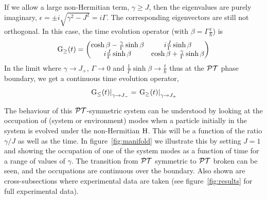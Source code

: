 If we allow a large non-Hermitian term, \( \gamma \geq J \), then the
eigenvalues are purely imaginary, \( \epsilon = \pm i \sqrt{ \gamma^{2} - J^{2}
} = i \Gamma \). The corresponding eigenvectors are still not orthogonal. In
this case, the time evolution operator (with \( \beta = \Gamma \frac{t}{\hbar}
\)) is
\begin{equation}
  \mathrm{G}_{\geq} \!\left(t\right) = \begin{pmatrix}
    \cosh \beta - \frac{\gamma}{\Gamma} \sinh \beta &
    i \frac{J}{\Gamma} \sinh \beta \\
    i \frac{J}{\Gamma} \sinh \beta &
    \cosh \beta + \frac{\gamma}{\Gamma} \sinh \beta
  \end{pmatrix}
\end{equation}
In the limit where \( \gamma \rightarrow J_{+} \), \( \Gamma \rightarrow 0 \)
and \( \frac{1}{\Gamma} \sinh \beta \rightarrow \frac{t}{\hbar} \) thus at the
\(\mathcal{PT}\) phase boundary, we get a continuous time evolution operator,
\begin{equation}
  \left. \mathrm{G}_{\leq} \!\left(t\right) \right|_{\gamma \rightarrow J_{-}} = \left.
    \mathrm{G}_{\geq} \!\left(t\right) \right|_{\gamma \rightarrow J_{+}}
\end{equation}

The behaviour of this \(\mathcal{PT}\)-symmetric system can be understood by looking at
the occupation of (system or environment) modes when a particle initially in the
system is evolved under the non-Hermitian \(\mathrm{H}\). This will be a function
of the ratio \(\gamma/J\) as well as the time. In figure~\ref{fig:manifold} we
illustrate this by setting \(J=1\) and showing the occupation of one of the
system modes as a function of time for a range of values of \(\gamma\). The
transition from \(\mathcal{PT}\) symmetric to \(\mathcal{PT}\) broken can be seen, and the
occupations are continuous over the boundary. Also shown are cross-subsections
where experimental data are taken (see figure~\ref{fig:results} for full
experimental data).

